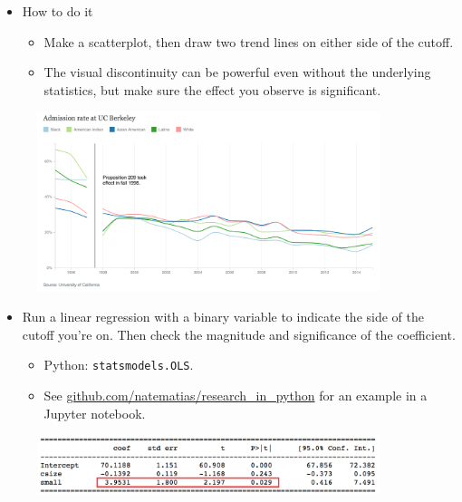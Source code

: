 \documentclass{beamer}
\begin{document}
\begin{frame}
	\begin{itemize}
		\item How to do it
		\begin{itemize}
			\item Make a scatterplot, then draw two trend lines on either side of the cutoff.
			\item The visual discontinuity can be powerful even without the underlying statistics, but make sure the effect you observe is significant.
		\end{itemize}
	\end{itemize}
	\begin{figure}
		\includegraphics[width=10cm]{affirmative-action.png}
		\centering
	\end{figure}
\end{frame}

\begin{frame}
	\begin{itemize}
		\item Run a linear regression with a binary variable to indicate the side of the cutoff you're on. Then check the magnitude and significance of the coefficient.
			\begin{itemize}
				\item Python: \texttt{statsmodels.OLS}.
				\item See \url{github.com/natematias/research_in_python} for an example in a Jupyter notebook.
			\end{itemize}
	\end{itemize}
	\begin{figure}
		\includegraphics[width=10cm]{matias-coeff.png}
		\centering
	\end{figure}
\end{frame}
\end{document}
